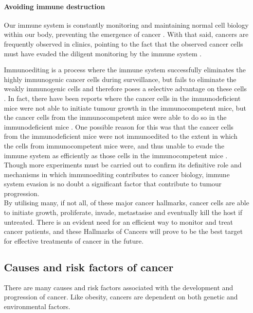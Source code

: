 \paragraph{Avoiding immune destruction}

\noindent
Our immune system is constantly monitoring and maintaining normal cell biology within our body, preventing the emergence of cancer \citep{Hanahan2011}.
With that said, cancers are frequently observed in clinics, pointing to the fact that the observed cancer cells must have evaded the diligent monitoring by the immune system \citep{Hanahan2011}.

Immunoediting is a process where the immune system successfully eliminates the highly immunogenic cancer cells during surveillance, but fails to eliminate the weakly immunogenic cells and therefore poses a selective advantage on these cells \citep{Hanahan2011,Teng2008}.
In fact, there have been reports where the cancer cells in the immunodeficient mice were not able to initiate tumour growth in the immunocompetent mice, but the cancer cells from the immunocompetent mice were able to do so in the immunodeficient mice \citep{Hanahan2011}.
One possible reason for this was that the cancer cells from the immunodeficient mice were not immunoedited to the extent in which the cells from immunocompetent mice were, and thus unable to evade the immune system as efficiently as those cells in the immunocompetent mice \citep{Hanahan2011}.
Though more experiments must be carried out to confirm its definitive role and mechanisms in which immunoediting contributes to cancer biology, immune system evasion is no doubt a significant factor that contribute to tumour progression. \\

\noindent
By utilising many, if not all, of these major cancer hallmarks, cancer cells are able to initiate growth, proliferate, invade, metastasise and eventually kill the host if untreated.
There is an evident need for an efficient way to monitor and treat cancer patients, and these Hallmarks of Cancers will prove to be the best target for effective treatments of cancer in the future.

\subsection{Causes and risk factors of cancer}
\label{sub:causes_and_risk_factors_of_cancer}

There are many causes and risk factors associated with the development and progression of cancer.
Like obesity, cancers are dependent on both genetic and environmental factors.


